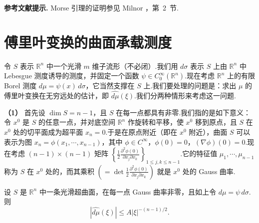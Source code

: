 \documentclass[
  BookTitleCN={傅里叶分析中的振动积分},
  BookTitleEN={Oscillatory Integrals in Fourier Analysis},
  OriginalAuthor={E.~M. Stein},
  OriginalEdition={Proc. Sympos. Pure Math. 35, Part~1},
  OriginalPublisher={American Mathematical Society},
  OriginalYear={1979},
  Translator={翻译及重排},
  ModelUsed={Codex CLI},
  Biblatex=false,
  TranslationDate={2026年8月27日}
]{mathtranslation}
\numberwithin{equation}{chapter}   %
\newcommand{\R}{\mathbb{R}}
\begin{document}
\noindent\textbf{参考文献提示.} Morse 引理的证明参见 Milnor \cite{ref20}，第~2~节.
\chapter{傅里叶变换的曲面承载测度}

\noindent 令 $S$ 表示 $\R^n$ 中一个光滑 $m$ 维子流形（不必闭）.我们用 $d\sigma$ 表示 $S$ 上由 $\R^n$ 中 Lebesgue 测度诱导的测度，并固定一个函数 $\psi\in C_0^\infty(\R^n)$.现在考虑 $\R^n$ 上的有限 Borel 测度 $d\mu=\psi(x)\,d\sigma$，它当然支撑在 $S$ 上.我们要处理的问题是：求出 $\mu$ 的傅里叶变换在无穷远处的估计，即 $\widehat{d\mu}(\xi)$.我们分两种情形来考虑这一问题.

\textbf{（1）} 首先设 $\dim S=n-1$，且 $S$ 在每一点都具有非零.我们指的是如下意义：令 $x^{0}$ 是 $S$ 的任意一点，并对底空间 $\R^n$ 作旋转和平移，使 $x^{0}$ 移到原点，且 $S$ 在 $x^{0}$ 处的切平面成为超平面 $x_n=0$.于是在原点附近（即在 $x^{0}$ 附近），曲面 $S$ 可以表示为图 $x_n=\phi(x_1,\cdots,x_{n-1})$，其中 $\phi\in C^\infty$，$\phi(0)=0$，$(\nabla\phi)(0)=0$.现在考虑 $(n-1)\times(n-1)$ 矩阵 $\left\{\frac{1}{2}\frac{\partial^{2}\phi(0)}{\partial x_j\partial x_k}\right\}_{1\leq j,k\leq n-1}$.它的特征值 $\mu_1,\cdots,\mu_{n-1}$ 称为 $S$ 在 $x^{0}$ 处的，而其乘积 $\left(=\det\frac{1}{2}\frac{\partial^{2}\phi(0)}{\partial x_j\partial x_k}\right)$ 就是 $x^{0}$ 处的 Gauss 曲率.

\begin{theorem}\label{thm:1}
  设 $S$ 是 $\R^n$ 中一条光滑超曲面，在每一点 Gauss 曲率非零，且如上令 $d\mu=\psi\,d\sigma$.则
  \begin{equation}
    |\widehat{d\mu}(\xi)|\leq A|\xi|^{-(n-1)/2}. \label{eq:3.1}
  \end{equation}
\end{theorem}
\end{document}
